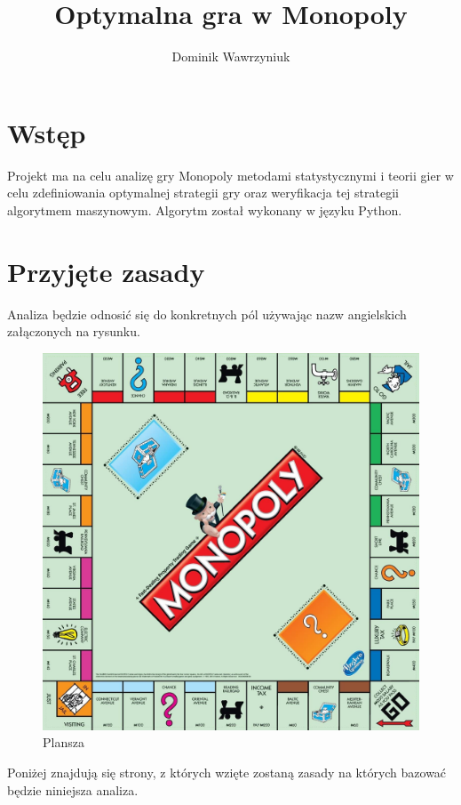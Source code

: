 \documentclass{article}
\title{Optymalna gra w Monopoly}
\author{Dominik Wawrzyniuk}
\begin{document}
\maketitle

\section{Wstęp}

Projekt ma na celu analizę gry Monopoly metodami statystycznymi i teorii gier w celu zdefiniowania optymalnej strategii gry oraz weryfikacja tej strategii algorytmem maszynowym. Algorytm został wykonany w języku Python.

\section{Przyjęte zasady}

Analiza będzie odnosić się do konkretnych pól używając nazw angielskich załączonych na rysunku.

\begin{figure}
	\includegraphics[width=\textwidth]{plansza}
	\caption{Plansza}
\end{figure}

Poniżej znajdują się strony, z których wzięte zostaną zasady na których bazować będzie niniejsza analiza.
\end{document}
